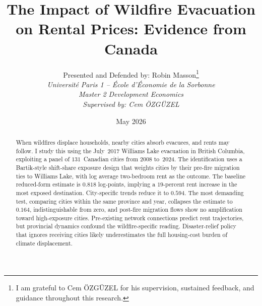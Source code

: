 \documentclass[12pt]{article}
\begin{document}
%
%
\author{Presented and Defended by: Robin Masson\thanks{I am grateful to Cem \"{O}ZG\"{U}ZEL for his supervision, sustained feedback, and guidance throughout this research.} \\
{\scriptsize \textsl{Universit\'{e} Paris 1 -- \'{E}cole d'\'{E}conomie de la Sorbonne}}\\
{\scriptsize \textsl{Master 2 Development Economics}}\\
{\scriptsize \textsl{Supervised by: Cem \"{O}ZG\"{U}ZEL}}}

\title{The Impact of Wildfire Evacuation on Rental Prices: Evidence from Canada}
\date{May 2026}
\maketitle

\begin{abstract}
\begin{singlespace}

When wildfires displace households, nearby cities absorb evacuees, and rents may follow. I study this using the July~2017 Williams Lake evacuation in British Columbia, exploiting a panel of $131$~Canadian cities from 2008 to~2024. The identification uses a Bartik-style shift-share exposure design that weights cities by their pre-fire migration ties to Williams Lake, with log average two-bedroom rent as the outcome. The baseline reduced-form estimate is $0.818$ log-points, implying a $19$-percent rent increase in the most exposed destination. City-specific trends reduce it to $0.594$. The most demanding test, comparing cities within the same province and year, collapses the estimate to $0.164$, indistinguishable from zero, and post-fire migration flows show no amplification toward high-exposure cities. Pre-existing network connections predict rent trajectories, but provincial dynamics confound the wildfire-specific reading. Disaster-relief policy that ignores receiving cities likely underestimates the full housing-cost burden of climate displacement.

\end{singlespace}
\end{abstract}
\end{document}
